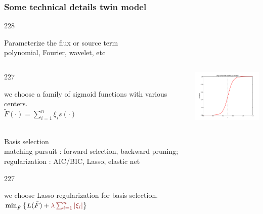 \documentclass{beamer}
\let\oldcite=\cite
\renewcommand{\cite}[1]{\textcolor[rgb]{.4,.4,.85}{\oldcite{#1}}}
\newcommand{\barrow}{\item[\color{darkred}\ding{228}]}
\newcommand{\carrow}{\item[\color{darkred}\ding{227}]}
\begin{document}
\setcounter{framenumber}{9}

\begin{frame}
    \frametitle{Some technical details \hfill \scriptsize{twin model}}\small
    \begin{dinglist}{228}
        \barrow Parameterize the flux or source term \\\vspace{.05cm} \scriptsize polynomial, Fourier, wavelet, etc\\
        \small
        \vspace{-.3cm}
        \begin{columns}
            \begin{dinglist}{227}
                \carrow we choose a family of sigmoid functions with various centers.\\\scriptsize
                        $
                            \tilde{F}(\cdot) = \sum_{i=1}^n \xi_i s(\cdot)
                        $
            \end{dinglist}
            \small
            \includegraphics[width=3.5cm]{sigmoid_3.png}
        \end{columns}
        \barrow Basis selection\\\vspace{.05cm}
            \scriptsize matching pursuit \cite{Adler 96, Billing07}: forward selection, backward pruning;\\
            regularization \cite{Stone 77, Schwarz 78, Tibshirani 96}: AIC/BIC, Lasso, elastic net
            \small\vspace{.16cm}
            \begin{dinglist}{227}
                \carrow we choose Lasso regularization for basis selection.\scriptsize\\
                $
                    \min_{\tilde{F}} \left\{ L(\tilde{F})+\textcolor{darkred}{\lambda\sum_{i=1}^n\left| \xi_i \right|}\right\}
                $
            \end{dinglist}
    \end{dinglist}
\end{frame}
\end{document}
